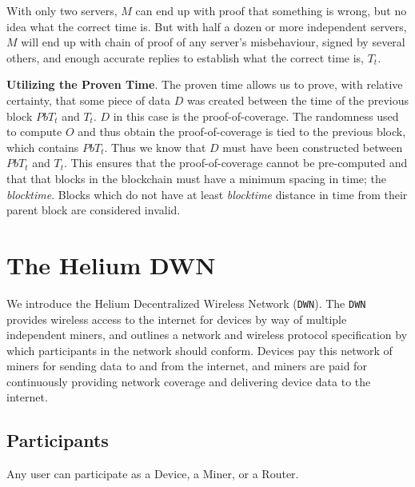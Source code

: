 \documentclass[letterpaper,11pt]{article}
\begin{document}
With only two servers, $M$ can end up with proof that something is wrong, but no idea what the correct time is. But with half a dozen or more independent servers, $M$ will end up with chain of proof of any server's misbehaviour, signed by several others, and enough accurate replies to establish what the correct time is, $T_t$.

\textbf{Utilizing the Proven Time}. The proven time allows us to prove, with relative certainty, that some piece of data $D$ was created between the time of the previous block $PbT_t$ and $T_t$. $D$ in this case is the proof-of-coverage. The randomness used to compute $O$ and thus obtain the proof-of-coverage is tied to the previous block, which contains $PbT_t$. Thus we know that $D$ must have been constructed between $PbT_t$ and $T_t$. This ensures that the proof-of-coverage cannot be pre-computed and that that blocks in the blockchain must have a minimum spacing in time; the \emph{blocktime}. Blocks which do not have at least \emph{blocktime} distance in time from their parent block are considered invalid.

\newpage

\section{The Helium DWN}

We introduce the Helium Decentralized Wireless Network (\verb|DWN|). The \verb|DWN| provides wireless access to the internet for devices by way of multiple independent miners, and outlines a network and wireless protocol specification by which participants in the network should conform. Devices pay this network of miners for sending data to and from the internet, and miners are paid for continuously providing network coverage and delivering device data to the internet.

\subsection{Participants}

Any user can participate as a Device, a Miner, or a Router.
\end{document}
